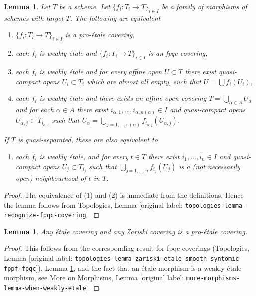 \documentclass[10pt,a4paper]{article}
\theoremstyle{plain}
\newtheorem{lemma}[subsection]{Lemma}
\theoremstyle{definition}
\theoremstyle{remark}
\numberwithin{equation}{subsection}
\begin{document}
\begin{lemma}
\label{lemma-recognize-proetale-covering}
Let $T$ be a scheme. Let $\{f_i : T_i \to T\}_{i \in I}$ be a family of
morphisms of schemes with target $T$. The following are equivalent
\begin{enumerate}
\item $\{f_i : T_i \to T\}_{i \in I}$ is a pro-\'etale covering,
\item each $f_i$ is weakly \'etale and $\{f_i : T_i \to T\}_{i \in I}$
is an fpqc covering,
\item each $f_i$ is weakly \'etale and for every affine open $U \subset T$
there exist quasi-compact opens $U_i \subset T_i$ which are almost all empty,
such that $U = \bigcup f_i(U_i)$,
\item each $f_i$ is weakly \'etale and there exists an affine open covering
$T = \bigcup_{\alpha \in A} U_\alpha$ and for each $\alpha \in A$
there exist $i_{\alpha, 1}, \ldots, i_{\alpha, n(\alpha)} \in I$
and quasi-compact opens $U_{\alpha, j} \subset T_{i_{\alpha, j}}$ such that
$U_\alpha =
\bigcup_{j = 1, \ldots, n(\alpha)} f_{i_{\alpha, j}}(U_{\alpha, j})$.
\end{enumerate}
If $T$ is quasi-separated, these are also equivalent to
\begin{enumerate}
\item[(5)] each $f_i$ is weakly \'etale, and for every $t \in T$ there exist
$i_1, \ldots, i_n \in I$ and quasi-compact opens $U_j \subset T_{i_j}$
such that $\bigcup_{j = 1, \ldots, n} f_{i_j}(U_j)$ is a
(not necessarily open) neighbourhood of $t$ in $T$.
\end{enumerate}
\end{lemma}

\begin{proof}
The equivalence of (1) and (2) is immediate from the definitions.
Hence the lemma follows from
Topologies, Lemma \textnormal{[original label: \nolinkurl{topologies-lemma-recognize-fpqc-covering}]}.
\end{proof}

\begin{lemma}
\label{lemma-etale-proetale}
Any \'etale covering and any Zariski covering is a pro-\'etale covering.
\end{lemma}

\begin{proof}
This follows from the corresponding result for fpqc coverings
(Topologies, Lemma
\textnormal{[original label: \nolinkurl{topologies-lemma-zariski-etale-smooth-syntomic-fppf-fpqc}]}),
Lemma \ref{lemma-recognize-proetale-covering}, and
the fact that an \'etale morphism is a weakly \'etale morphism, see
More on Morphisms, Lemma \textnormal{[original label: \nolinkurl{more-morphisms-lemma-when-weakly-etale}]}.
\end{proof}
\end{document}
